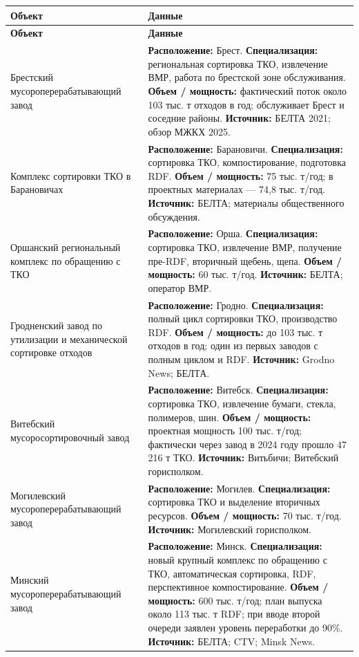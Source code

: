 \documentclass[14pt,a4paper]{extarticle}
\begin{document}
\begin{longtable}{>{\raggedright\arraybackslash}p{5.55cm}>{\raggedright\arraybackslash}p{10.0cm}}
\toprule
\textbf{Объект} & \textbf{Данные} \\
\midrule
\endfirsthead
\toprule
\textbf{Объект} & \textbf{Данные} \\
\midrule
\endhead
Брестский мусороперерабатывающий завод & \textbf{Расположение:} Брест. \textbf{Специализация:} региональная сортировка ТКО, извлечение ВМР, работа по брестской зоне обслуживания. \textbf{Объем / мощность:} фактический поток около 103 тыс. т отходов в год; обслуживает Брест и соседние районы. \textbf{Источник:} БЕЛТА 2021; обзор МЖКХ 2025. \\
Комплекс сортировки ТКО в Барановичах & \textbf{Расположение:} Барановичи. \textbf{Специализация:} сортировка ТКО, компостирование, подготовка RDF. \textbf{Объем / мощность:} 75 тыс. т/год; в проектных материалах --- 74,8 тыс. т/год. \textbf{Источник:} БЕЛТА; материалы общественного обсуждения. \\
Оршанский региональный комплекс по обращению с ТКО & \textbf{Расположение:} Орша. \textbf{Специализация:} сортировка ТКО, извлечение ВМР, получение пре-RDF, вторичный щебень, щепа. \textbf{Объем / мощность:} 60 тыс. т/год. \textbf{Источник:} БЕЛТА; оператор ВМР. \\
Гродненский завод по утилизации и механической сортировке отходов & \textbf{Расположение:} Гродно. \textbf{Специализация:} полный цикл сортировки ТКО, производство RDF. \textbf{Объем / мощность:} до 103 тыс. т отходов в год; один из первых заводов с полным циклом и RDF. \textbf{Источник:} Grodno News; БЕЛТА. \\
Витебский мусоросортировочный завод & \textbf{Расположение:} Витебск. \textbf{Специализация:} сортировка ТКО, извлечение бумаги, стекла, полимеров, шин. \textbf{Объем / мощность:} проектная мощность 100 тыс. т/год; фактически через завод в 2024 году прошло 47 216 т ТКО. \textbf{Источник:} Витьбичи; Витебский горисполком. \\
Могилевский мусороперерабатывающий завод & \textbf{Расположение:} Могилев. \textbf{Специализация:} сортировка ТКО и выделение вторичных ресурсов. \textbf{Объем / мощность:} 70 тыс. т/год. \textbf{Источник:} Могилевский горисполком. \\
Минский мусороперерабатывающий завод & \textbf{Расположение:} Минск. \textbf{Специализация:} новый крупный комплекс по обращению с ТКО, автоматическая сортировка, RDF, перспективное компостирование. \textbf{Объем / мощность:} 600 тыс. т/год; план выпуска около 113 тыс. т RDF; при вводе второй очереди заявлен уровень переработки до 90\%. \textbf{Источник:} БЕЛТА; CTV; Minsk News. \\

\end{longtable}
\end{document}
